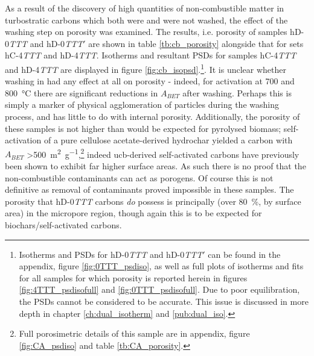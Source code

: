 As a result of the discovery of high quantities of non-combustible matter in turbostratic carbons which both were and were not washed, the effect of the washing step on porosity was examined. The results, i.e. porosity of samples hD-0\textit{TTT} and hD-0\textit{TTT}$'$ are shown in table \ref{tb:cb_porosity} alongside that for sets hC-4\textit{TTT} and hD-4\textit{TTT}. Isotherms and resultant PSDs for samples hC-4\textit{TTT} and hD-4\textit{TTT} are displayed in figure \ref{fig:cb_isopsd}.\footnote{Isotherms and PSDs for hD-0\textit{TTT} and hD-0\textit{TTT}$'$ can be found in the appendix, figure \ref{fig:0TTT_psdiso}, as well as full plots of isotherms and fits for all samples for which porosity is reported herein in figures \ref{fig:4TTT_psdisofull} and \ref{fig:0TTT_psdisofull}. Due to poor equilibration, the PSDs cannot be considered to be accurate. This issue is discussed in more depth in chapter \ref{ch:dual_isotherm} and \ref{pub:dual_iso}.}.  It is unclear whether washing in  had any effect at all on porosity - indeed, for activation at 700 and \qty{800}{\degreeCelsius} there are significant reductions in $A_{BET}$ after washing. Perhaps this is simply a marker of physical agglomeration of particles during the washing process, and has little to do with internal porosity. Additionally, the porosity of these samples is not higher than would be expected for pyrolysed biomass; \gls{self-activation} of a pure cellulose acetate-derived \gls{hydrochar} yielded a carbon with $A_{BET}$  \qty{>500}{\metre\squared\per\gram},\footnote{Full porosimetric details of this sample are in appendix, figure \ref{fig:CA_psdiso} and table \ref{tb:CA_porosity}.} indeed \acrshort{ucb}-derived self-activated carbons have previously been shown to exhibit far higher surface areas.\citep{Soltani2013, Yazdi2012, Lee2014, Yu2018, Koochaki2019} As such there is no proof that the non-combustible contaminants can act as \glspl{porogen}. Of course this is not definitive as removal of contaminants proved impossible in these samples. The porosity that hD-0\textit{TTT} carbons \textit{do} possess is principally (over \qty{80}{\percent}, by surface area) in the \gls{micropore} region, though again this is to be expected for \glspl{biochar}/self-activated carbons.\citep{Weber2018Properties, Jagiello2019Enhanced, suliman2017role}

